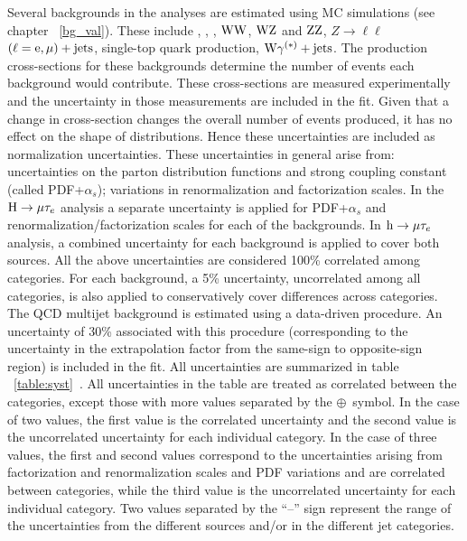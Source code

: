 Several backgrounds in the analyses are estimated using MC simulations (see chapter ~\ref{bg_val}). These include \ztt, \ttb, \wjets, $\text{W}\text{W}$, $\text{W}\text{Z}$ and $\text{Z}\text{Z}$, $Z\to\ell\ell$ $(\ell = \text{e}, \mu)+\text{jets}$, single-top quark production, $\text{W}\gamma^{(*)}+\text{jets}$. The production cross-sections for these backgrounds determine the number of events each background would contribute. These cross-sections are measured experimentally and the uncertainty in those measurements are included in the fit. Given that a change in cross-section changes the overall number of events produced, it has no effect on the shape of distributions. Hence these uncertainties are included as normalization uncertainties. These uncertainties in general  arise from: uncertainties on the parton distribution functions and strong coupling constant (called PDF+$\alpha_s$); variations in renormalization and factorization scales. In the $\text{H} \to \mu \tau_{e}$ analysis a separate uncertainty is applied for PDF+$\alpha_s$ and renormalization/factorization scales for each of the backgrounds. In $\text{h} \to \mu \tau_{e}$ analysis, a combined uncertainty for each background is applied to cover both sources. All the above uncertainties are considered 100\% correlated among categories. For each background, a 5\% uncertainty, uncorrelated among all categories, is also applied to conservatively cover differences across categories. The QCD multijet background is estimated using a data-driven procedure. An uncertainty of 30\% associated with this procedure (corresponding to the uncertainty in the extrapolation factor from the same-sign to opposite-sign region) is included in the fit. All uncertainties are summarized in table ~\ref{table:syst}~\cite{HIG-17-001,HIG-18-017}. All uncertainties in the table are treated as correlated between the categories, except those with more values separated by the $\oplus$~symbol. In the case of two values, the first value is the correlated uncertainty and the second value is the uncorrelated uncertainty for each individual category. In the case of three values, the  first and second values correspond to the uncertainties arising from factorization and renormalization scales and PDF variations and are correlated between categories, while the third value is the uncorrelated uncertainty for each individual category. Two values separated by the ``--'' sign represent the range of the uncertainties from the different sources and/or in the different jet categories.

